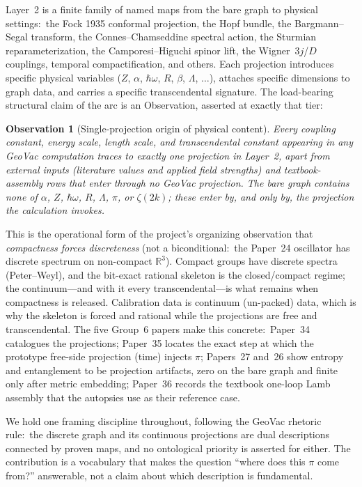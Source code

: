 \documentclass[aps,pra,twocolumn,superscriptaddress,longbibliography,nofootinbib]{revtex4-2}
\newtheorem{observation}{Observation}
\begin{document}
Layer~2 is a finite family of named maps from the bare graph to physical
settings:\ the Fock 1935 conformal projection, the Hopf bundle, the
Bargmann--Segal transform, the Connes--Chamseddine spectral action, the
Sturmian reparameterization, the Camporesi--Higuchi spinor lift, the
Wigner~$3j$/$D$ couplings, temporal compactification, and others.  Each
projection introduces specific physical variables ($Z$, $\alpha$,
$\hbar\omega$, $R$, $\beta$, $\Lambda$, $\ldots$), attaches specific
dimensions to graph data, and carries a specific transcendental
signature.  The load-bearing structural claim of the arc is an
Observation, asserted at exactly that tier:

\begin{observation}[Single-projection origin of physical content]
Every coupling constant, energy scale, length scale, and transcendental
constant appearing in any GeoVac computation traces to exactly one
projection in Layer~2, apart from external inputs (literature
values and applied field strengths) and textbook-assembly rows that
enter through no GeoVac projection.  The bare graph contains none of $\alpha$, $Z$,
$\hbar\omega$, $R$, $\Lambda$, $\pi$, or $\zeta(2k)$; these enter by, and
only by, the projection the calculation invokes.
\end{observation}

This is the operational form of the project's organizing observation that
\emph{compactness forces discreteness} (not a biconditional:\ the Paper~24
oscillator has discrete spectrum on non-compact $\mathbb{R}^3$).  Compact groups have discrete spectra
(Peter--Weyl), and the bit-exact rational skeleton is the closed/compact
regime; the continuum---and with it every transcendental---is what remains
when compactness is released.  Calibration data is continuum (un-packed)
data, which is why the skeleton is forced and rational while the
projections are free and transcendental.  The five Group~6 papers make
this concrete:\ Paper~34 catalogues the projections; Paper~35 locates the
exact step at which the prototype free-side projection (time) injects
$\pi$; Papers~27 and~26 show entropy and entanglement to be projection
artifacts, zero on the bare graph and finite only after metric embedding;
Paper~36 records the textbook one-loop Lamb assembly that the autopsies
use as their reference case.

We hold one framing discipline throughout, following the GeoVac rhetoric
rule:\ the discrete graph and its continuous projections are dual
descriptions connected by proven maps, and no ontological priority is
asserted for either.  The contribution is a vocabulary that makes the
question ``where does this $\pi$ come from?'' answerable, not a claim
about which description is fundamental.
\end{document}

